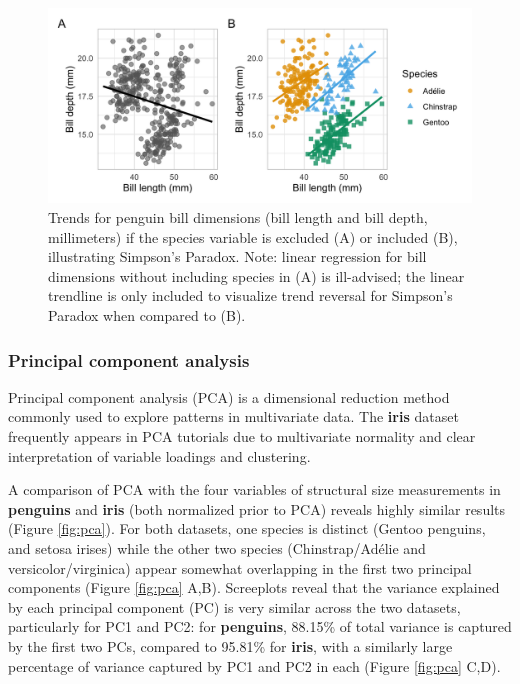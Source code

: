 \begin{Schunk}
\begin{figure}[htbp]

{\centering \includegraphics[width=\textwidth]{figs/simpsons-1} 

}

\caption[Trends for penguin bill dimensions (bill length and bill depth, millimeters) if the species variable is excluded (A) or included (B), illustrating Simpson’s Paradox]{Trends for penguin bill dimensions (bill length and bill depth, millimeters) if the species variable is excluded (A) or included (B), illustrating Simpson’s Paradox. Note: linear regression for bill dimensions without including species in (A) is ill-advised; the linear trendline is only included to visualize trend reversal for Simpson’s Paradox when compared to (B).}\label{fig:simpsons}
\end{figure}
\end{Schunk}

\hypertarget{principal-component-analysis}{%
\subsubsection{Principal component
analysis}\label{principal-component-analysis}}

Principal component analysis (PCA) is a dimensional reduction method
commonly used to explore patterns in multivariate data. The
\textbf{iris} dataset frequently appears in PCA tutorials due to
multivariate normality and clear interpretation of variable loadings and
clustering.

A comparison of PCA with the four variables of structural size
measurements in \textbf{penguins} and \textbf{iris} (both normalized
prior to PCA) reveals highly similar results (Figure \ref{fig:pca}). For
both datasets, one species is distinct (Gentoo penguins, and setosa
irises) while the other two species (Chinstrap/Adélie and
versicolor/virginica) appear somewhat overlapping in the first two
principal components (Figure \ref{fig:pca} A,B). Screeplots reveal that
the variance explained by each principal component (PC) is very similar
across the two datasets, particularly for PC1 and PC2: for
\textbf{penguins}, 88.15\% of total variance is captured by the first
two PCs, compared to 95.81\% for \textbf{iris}, with a similarly large
percentage of variance captured by PC1 and PC2 in each (Figure
\ref{fig:pca} C,D).

